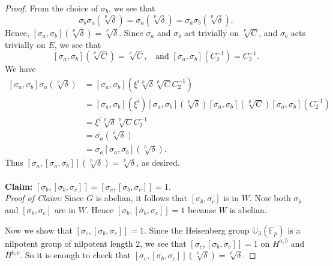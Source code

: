\documentclass[12pt,leqno]{amsart}
\theoremstyle{plain}
\theoremstyle{definition}
\newcommand{\F}{{\mathbb F}}
\newcommand{\U}{{\mathbb U}}
\begin{document}
\begin{proof}
From the choice of $\sigma_b$, we see that
\[
\sigma_b\sigma_a(\sqrt[p]{\delta})=\sigma_a(\sqrt[p]{\delta})= \sigma_a\sigma_b(\sqrt[p]{\delta}).
\]
Hence, $[\sigma_a,\sigma_b](\sqrt[p]{\delta})=\sqrt[p]{\delta}$. Since $\sigma_a$ and $\sigma_b$ act trivially on $\sqrt[p]{C}$, and $\sigma_b$ acts trivially on $E$, we see that
\[
[\sigma_a,\sigma_b](\sqrt[p]{C})=\sqrt[p]{C},\;\; \text{ and } [\sigma_a,\sigma_b](C_2^{-1})=C_2^{-1}.
\]
We have 
\[
\begin{aligned}
{[\sigma_a,\sigma_b]}\sigma_a (\sqrt[p]{\delta})&=[\sigma_a,\sigma_b](\xi^i\sqrt[p]{\delta}\sqrt[p]{C}C_2^{-1})\\
&= [\sigma_a,\sigma_b](\xi^i) [\sigma_a,\sigma_b](\sqrt[p]{\delta}) [\sigma_a,\sigma_b](\sqrt[p]{C}) [\sigma_a,\sigma_b](C_2^{-1})\\
&= \xi^i \sqrt[p]{\delta}\sqrt[p]{C}C_2^{-1}\\
&=\sigma_a(\sqrt[p]{\delta})\\
&=\sigma_a[\sigma_a,\sigma_b](\sqrt[p]{\delta}).
\end{aligned}
\]
Thus $[\sigma_a,[\sigma_a,\sigma_b]](\sqrt[p]{\delta})=\sqrt[p]{\delta}$, as desired. 
\\
\\
{\bf Claim:} $[\sigma_b,[\sigma_b,\sigma_c]]=[\sigma_c,[\sigma_b,\sigma_c]]=1$.\\
{\it Proof of Claim:} Since $G$ is abelian, it follows that $[\sigma_b,\sigma_c]$ is in $W$. Now both $\sigma_b$ and $[\sigma_b,\sigma_c]$ are in $W$. Hence $[\sigma_b,[\sigma_b,\sigma_c]]=1$ because $W$ is abelian.

Now we show that $[\sigma_c,[\sigma_b,\sigma_c]]=1$. Since the Heisenberg group $\U_3(\F_p)$ is a nilpotent group of nilpotent length 2, we see that $[\sigma_c,[\sigma_b,\sigma_c]]=1$ on $H^{a,b}$ and $H^{b,c}$. So it is enough to check that $[\sigma_c,[\sigma_b,\sigma_c]](\sqrt[p]{\delta})=\sqrt[p]{\delta}$.


\end{proof}
\end{document}
